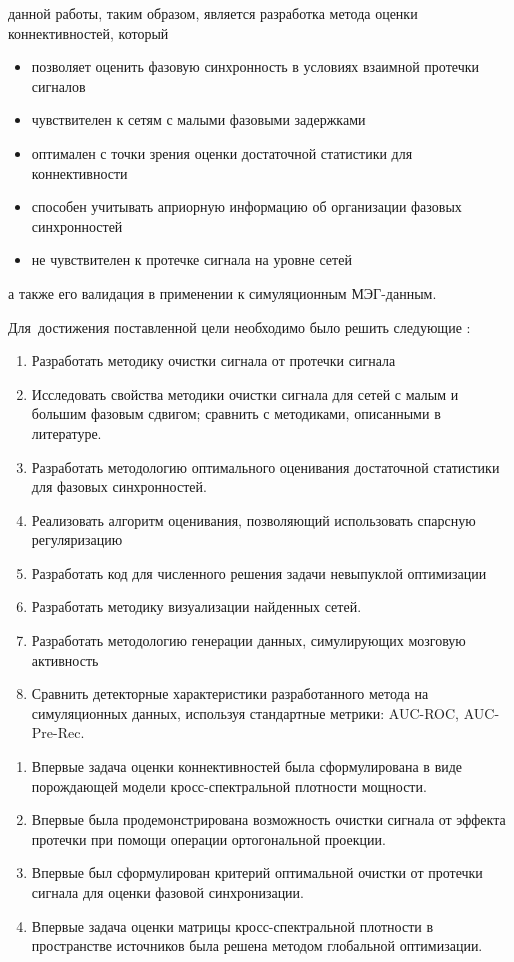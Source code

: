 {\aim} данной работы, таким образом, является разработка метода
оценки коннективностей, который
\begin{itemize}
        \item позволяет оценить фазовую синхронность в условиях взаимной протечки сигналов
        \item чувствителен к сетям с малыми фазовыми задержками
        \item оптимален с точки зрения оценки достаточной статистики для коннективности
        \item способен учитывать априорную информацию об организации фазовых синхронностей
        \item не чувствителен к протечке сигнала на уровне сетей
\end{itemize}
а также его валидация в применении к симуляционным МЭГ-данным.

Для~достижения поставленной цели необходимо было решить следующие {\tasks}:
\begin{enumerate}
  \item Разработать методику очистки сигнала от протечки сигнала
  \item Исследовать свойства методики очистки сигнала
        для сетей с малым и большим фазовым сдвигом;
        сравнить с методиками, описанными в литературе.
  \item Разработать методологию оптимального оценивания достаточной статистики
        для фазовых синхронностей.
  \item Реализовать алгоритм оценивания, позволяющий использовать спарсную регуляризацию
  \item Разработать код для численного решения задачи невыпуклой оптимизации
  \item Разработать методику визуализации найденных сетей.
  \item Разработать методологию генерации данных, симулирующих мозговую активность
  \item Сравнить детекторные характеристики разработанного метода на симуляционных данных,
        используя стандартные метрики: AUC-ROC, AUC-Pre-Rec.
\end{enumerate}


{\novelty}
\begin{enumerate}
  \item Впервые задача оценки коннективностей была сформулирована в виде порождающей модели
      кросс-спектральной плотности мощности.
  \item Впервые была продемонстрирована возможность очистки сигнала от эффекта протечки
        при помощи операции ортогональной проекции.
  \item Впервые был сформулирован критерий оптимальной очистки от протечки сигнала
      для оценки фазовой синхронизации.
  \item Впервые задача оценки матрицы кросс-спектральной плотности в пространстве источников
        была решена методом глобальной оптимизации.
\end{enumerate}

